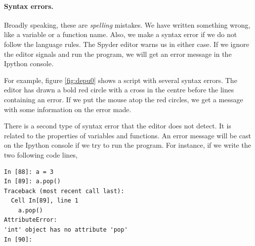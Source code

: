 \begin{paracol}{2}
\paragraph{Syntax errors.} Broadly speaking, these are \emph{spelling} mistakes. We have written something wrong, like a variable or a function name. Also, we make a syntax error if we do not follow the language rules. The Spyder editor warns us in either case. If we ignore the editor signals and run the program, we will get an error message in the Ipython console. 

For example, figure \ref{fig:depu0} shows a script with several syntax errors. The editor has drawn a bold red circle with a cross in the centre before the lines containing an error. If we put the mouse atop the red circles, we get a message with some information on the error made.

There is a second type of syntax error that the editor does not detect. It is related to the properties of variables and functions. An error message will be cast on the Ipython console if we try to run the program. For instance, if we write the two following code lines, 
\end{paracol}
\begin{center}
    \begin{minipage}{.4\textwidth}
\begin{verbatim}
In [88]: a = 3
In [89]: a.pop()
Traceback (most recent call last):
  Cell In[89], line 1
    a.pop()
AttributeError: 
'int' object has no attribute 'pop'
In [90]:
\end{verbatim}
\end{minipage}
\end{center}


